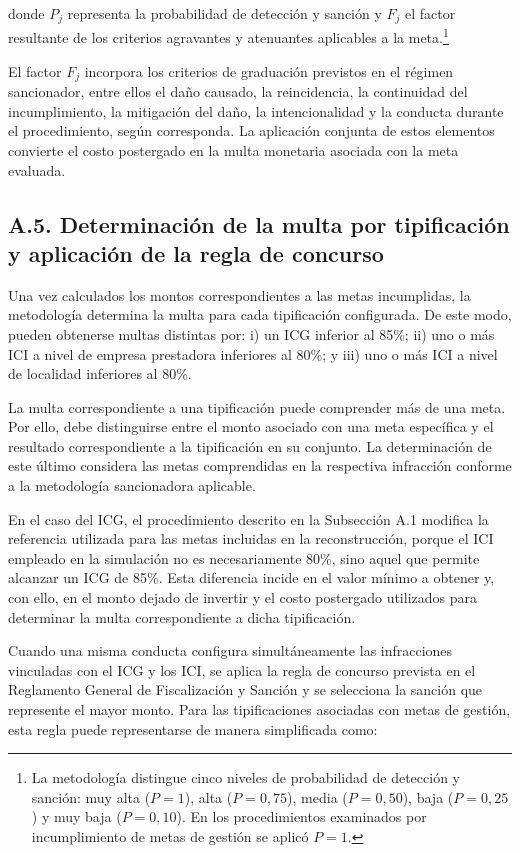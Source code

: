 donde \(P_j\) representa la probabilidad de detección y sanción y \(F_j\) el factor resultante de los criterios agravantes y atenuantes aplicables a la meta.\footnote{La metodología distingue cinco niveles de probabilidad de detección y sanción: muy alta (\(P=1\)), alta (\(P=0{,}75\)), media (\(P=0{,}50\)), baja (\(P=0{,}25\)) y muy baja (\(P=0{,}10\)). En los procedimientos examinados por incumplimiento de metas de gestión se aplicó \(P=1\).}

El factor \(F_j\) incorpora los criterios de graduación previstos en el régimen sancionador, entre ellos el daño causado, la reincidencia, la continuidad del incumplimiento, la mitigación del daño, la intencionalidad y la conducta durante el procedimiento, según corresponda. La aplicación conjunta de estos elementos convierte el costo postergado en la multa monetaria asociada con la meta evaluada.

\subsection*{A.5. Determinación de la multa por tipificación y aplicación de la regla de concurso}

Una vez calculados los montos correspondientes a las metas incumplidas, la metodología determina la multa para cada tipificación configurada. De este modo, pueden obtenerse multas distintas por: i) un ICG inferior al 85\%; ii) uno o más ICI a nivel de empresa prestadora inferiores al 80\%; y iii) uno o más ICI a nivel de localidad inferiores al 80\%.

La multa correspondiente a una tipificación puede comprender más de una meta. Por ello, debe distinguirse entre el monto asociado con una meta específica y el resultado correspondiente a la tipificación en su conjunto. La determinación de este último considera las metas comprendidas en la respectiva infracción conforme a la metodología sancionadora aplicable.

En el caso del ICG, el procedimiento descrito en la Subsección A.1 modifica la referencia utilizada para las metas incluidas en la reconstrucción, porque el ICI empleado en la simulación no es necesariamente 80\%, sino aquel que permite alcanzar un ICG de 85\%. Esta diferencia incide en el valor mínimo a obtener y, con ello, en el monto dejado de invertir y el costo postergado utilizados para determinar la multa correspondiente a dicha tipificación.

Cuando una misma conducta configura simultáneamente las infracciones vinculadas con el ICG y los ICI, se aplica la regla de concurso prevista en el Reglamento General de Fiscalización y Sanción y se selecciona la sanción que represente el mayor monto. Para las tipificaciones asociadas con metas de gestión, esta regla puede representarse de manera simplificada como:

